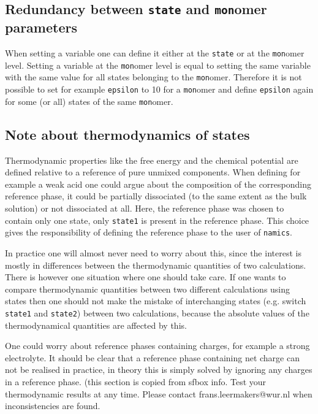 \documentclass{article}
\newcommand{\namics}{{\tt namics}}
\begin{document}
\subsection{Redundancy between {\tt state} and {\tt mon}omer parameters}

When setting a variable one can define it either at the {\tt state} or at the {\tt mon}omer level.  Setting a variable at the {\tt mon}omer level is equal to setting the same variable with the same value for all states belonging to the {\tt mon}omer.  Therefore it is not possible to set for example {\tt epsilon} to 10 for a {\tt mon}omer and define {\tt epsilon} again for some (or all) states of the same {\tt mon}omer.

\subsection{Note about thermodynamics of states}
Thermodynamic properties like the free energy and the chemical potential are defined relative to a reference of pure unmixed components.  When defining for example a weak acid one could argue about the composition of the corresponding reference phase, it could be partially dissociated (to the same extent as the bulk solution) or not dissociated at all.  Here, the reference phase was chosen to contain only one state, only {\tt state1} is present in the reference phase.  This choice gives the responsibility of defining the reference phase to the user of \namics.

In practice one will almost never need to worry about this, since the interest is mostly in differences between the thermodynamic quantities of two calculations.  There is however one situation where one should take care.  If one wants to compare thermodynamic quantities between two different calculations using states then one should not make the mistake of interchanging states (e.g. switch {\tt state1} and {\tt state2}) between two calculations, because the absolute values of the thermodynamical quantities are affected by this.

One could worry about reference phases containing charges, for example a strong electrolyte.  It should be clear that a reference phase containing net charge can not be realised in practice, in theory this is simply solved by ignoring any charges in a reference phase.
(this section is copied from sfbox info. Test your thermodynamic results at any time. Please contact frans.leermakers@wur.nl when inconsistencies are found.
\end{document}
